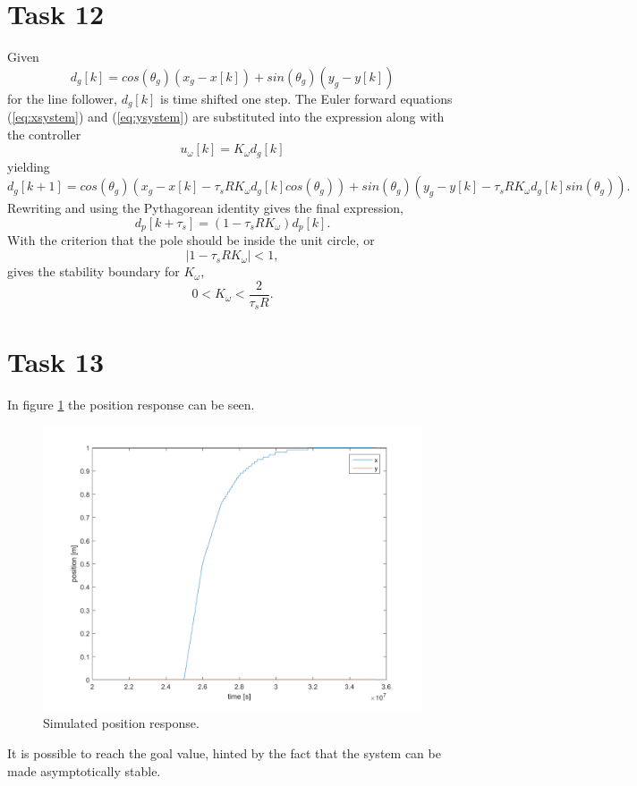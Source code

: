 \documentclass[a4paper,12pt,oneside,onecolumn]{article} %
\begin{document}
\section*{Task 12}
Given
\begin{equation}
d_g[k] = cos(\theta_g) (x_g - x[k]) + sin(\theta_g) (y_g - y[k])
\end{equation}
for the line follower, $d_g[k]$ is time shifted one step. The Euler forward equations (\ref{eq:xsystem}) and (\ref{eq:ysystem}) are substituted into the expression along with the controller
\begin{equation}
u_\omega[k] = K_\omega d_g[k]
\end{equation} 
yielding
\begin{equation}
d_g[k+1] = cos(\theta_g)(x_g - x[k] - \tau_s R K_\omega d_g[k] cos(\theta_g)) + sin(\theta_g)(y_g - y[k] - \tau_s R K_\omega d_g[k] sin(\theta_g)).
\end{equation}
Rewriting and using the  Pythagorean identity gives the final expression,
\begin{equation}
d_p[k+\tau_s] = (1 - \tau_s R K_\omega) d_p[k].
\end{equation}
With the criterion that the pole should be inside the unit circle, or
\begin{equation}
\left| 1 - \tau_s R K_\omega \right| < 1,
\end{equation}
gives the stability boundary for $K_\omega$,
\begin{equation}
0 < K_\omega < \frac{2}{\tau_s R}.
\end{equation}
\section*{Task 13}

 In figure \ref{fig:task13_positionplot} the position response can be seen.

\begin{figure}[H]
        \centering
        \includegraphics[scale = 0.5]{../matlab/images/task13_positionplot.png}
        \caption{Simulated position response.}
        \label{fig:task13_positionplot}
    \end{figure}
It is possible to reach the goal value, hinted by the fact that the system can be made asymptotically stable.
\end{document}

